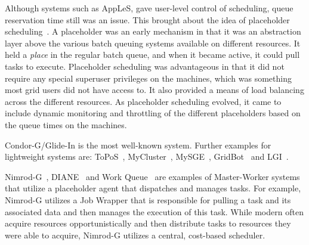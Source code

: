 \documentclass{sig-alternate}
\begin{document}
Although systems such as AppLeS, gave user-level control of
scheduling, queue reservation time still was an issue. 
This brought about the idea of placeholder
scheduling~\cite{Pinchak02practicalheterogeneous,
  Singh:2008:WTC:1341811.1341822}. A placeholder was an early \pilot
mechanism in that it was an abstraction layer above the various batch
queuing systems available on different resources. It held a
\textit{place} in the regular batch queue, and when it became active,
it could pull tasks to execute.  Placeholder scheduling was
advantageous in that it did not require any special superuser
privileges on the machines, which was something most grid users did
not have access to. It also provided a means of load balancing across
the different resources. As placeholder scheduling evolved, it came to
include dynamic monitoring and throttling of the different
placeholders based on the queue times on the machines.

Condor-G/Glide-In is the most well-known \pilotjob system. Further examples for
lightweight \pilotjob systems are: ToPoS~\cite{topos},
MyCluster~\cite{Walker:2007:PAC:1285840.1285848}, MySGE~\cite{mysge},
GridBot~\cite{Silberstein:2009:GEB:1654059.1654071} and LGI~\cite{lgi}.


Nimrod-G~\cite{10.1109/HPC.2000.846563}, DIANE~\cite{diane-thesis} and Work
Queue~\cite{workqueue-pyhpc2011} are examples of Master-Worker systems that
utilize a placeholder agent that dispatches and manages tasks. For example,
Nimrod-G utilizes a Job Wrapper that is responsible for pulling a task and its
associated data and then manages the execution of this task. While modern
\pilotjobs often acquire resources opportunistically and then distribute tasks
to resources they were able to acquire, Nimrod-G utilizes a central,
cost-based scheduler.
\end{document}
